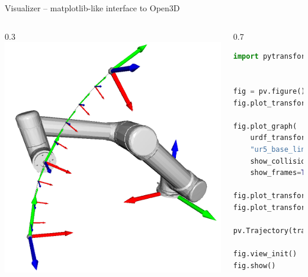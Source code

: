 \documentclass[14pt,aspectratio=169]{beamer}
\begin{document}
\begin{frame}[fragile]{Visualizer -- matplotlib-like interface to Open3D}
\begin{columns}
\begin{column}{0.3\textwidth}
\includegraphics[width=\textwidth]{images/movement_primitives_cart_dmp_ur5}
\end{column}
\begin{column}{0.7\textwidth}
\begin{lstlisting}[language=Python]
import pytransform3d.visualizer as pv


fig = pv.figure()
fig.plot_transform(s=0.3)

fig.plot_graph(
    urdf_transform_manager,
    "ur5_base_link",
    show_collision_objects=True,
    show_frames=True)

fig.plot_transform(ee2base_start)
fig.plot_transform(ee2base_end)

pv.Trajectory(trajectory).add_artist(fig)

fig.view_init()
fig.show()
\end{lstlisting}
\end{column}
\end{columns}
\end{frame}
\end{document}
